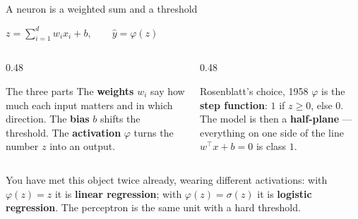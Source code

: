 \documentclass[aspectratio=169]{beamer}
\begin{document}
\begin{frame}[shrink=6]{A neuron is a weighted sum and a threshold}
  \begin{exampleblock}{}
    \centering\large
    $\displaystyle z = \sum_{i=1}^{d} w_i x_i + b, \qquad
      \hat y = \varphi(z)$
  \end{exampleblock}
  \begin{columns}[T]
    \begin{column}{0.48\textwidth}
      \begin{block}{The three parts}
        The \textbf{weights} $w_i$ say how much each input matters and in
        which direction. The \textbf{bias} $b$ shifts the threshold. The
        \textbf{activation} $\varphi$ turns the number $z$ into an output.
      \end{block}
    \end{column}
    \begin{column}{0.48\textwidth}
      \begin{block}{Rosenblatt's choice, 1958}
        $\varphi$ is the \textbf{step function}: $1$ if $z \ge 0$, else $0$.
        The model is then a \textbf{half-plane} --- everything on one side of
        the line $w^\top x + b = 0$ is class $1$.
      \end{block}
    \end{column}
  \end{columns}
  \vspace{0.2em}
  \begin{center}\small
    You have met this object twice already, wearing different activations:
    with $\varphi(z) = z$ it is \textbf{linear regression}; with
    $\varphi(z) = \sigma(z)$ it is \textbf{logistic regression}. The
    perceptron is the same unit with a hard threshold.
  \end{center}
\end{frame}
\end{document}
